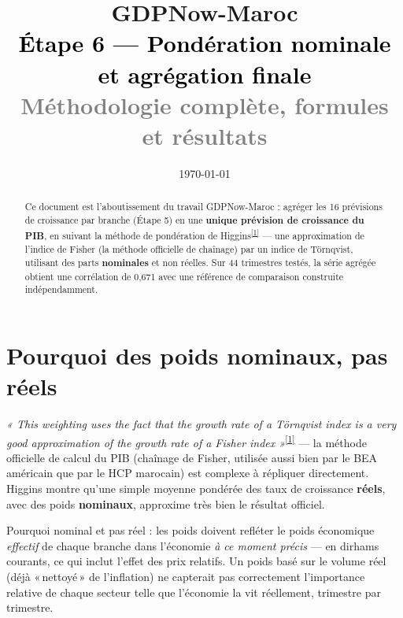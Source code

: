 \documentclass[11pt,a4paper]{article}
\title{\vspace{-1.3cm}\textcolor{bleuprincip}{\Huge\bfseries GDPNow-Maroc}\\[0.3cm]
\textcolor{black}{\Large Étape 6 --- Pondération nominale et agrégation finale}\\[0.15cm]
\textcolor{gray}{\large Méthodologie complète, formules et résultats}}
\author{}
\date{\today}
\newcommand{\cit}[1]{\textsuperscript{\hyperlink{ref#1}{[#1]}}}
\begin{document}
\maketitle
\thispagestyle{empty}

\begin{abstract}
\noindent Ce document est l'aboutissement du travail GDPNow-Maroc : agréger les 16 prévisions de croissance par branche (Étape 5) en une \textbf{unique prévision de croissance du PIB}, en suivant la méthode de pondération de Higgins\cit{1} --- une approximation de l'indice de Fisher (la méthode officielle de chaînage) par un indice de Törnqvist, utilisant des parts \textbf{nominales} et non réelles. Sur 44 trimestres testés, la série agrégée obtient une corrélation de 0,671 avec une référence de comparaison construite indépendamment.
\end{abstract}

\tableofcontents
\vspace{0.5cm}

\section{Pourquoi des poids nominaux, pas réels}

\begin{definitionbox}
\textit{« This weighting uses the fact that the growth rate of a Törnqvist index is a very good approximation of the growth rate of a Fisher index »}\cit{1} --- la méthode officielle de calcul du PIB (chaînage de Fisher, utilisée aussi bien par le BEA américain que par le HCP marocain) est complexe à répliquer directement. Higgins montre qu'une simple moyenne pondérée des taux de croissance \textbf{réels}, avec des poids \textbf{nominaux}, approxime très bien le résultat officiel.
\end{definitionbox}

\begin{intuition}
Pourquoi nominal et pas réel : les poids doivent refléter le poids économique \emph{effectif} de chaque branche dans l'économie \emph{à ce moment précis} --- en dirhams courants, ce qui inclut l'effet des prix relatifs. Un poids basé sur le volume réel (déjà «\,nettoyé\,» de l'inflation) ne capterait pas correctement l'importance relative de chaque secteur telle que l'économie la vit réellement, trimestre par trimestre.
\end{intuition}
\end{document}

